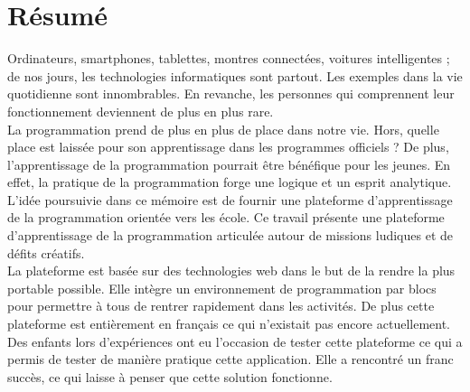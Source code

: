 \section*{Résumé}
Ordinateurs, smartphones, tablettes, montres connectées, voitures intelligentes ; de nos jours, les technologies informatiques sont partout. Les exemples dans la vie quotidienne sont innombrables. En revanche, les personnes qui comprennent leur fonctionnement deviennent de plus en plus rare.\\

La programmation prend de plus en plus de place dans notre vie. Hors, quelle place est laissée pour son apprentissage dans les programmes officiels ? De plus, l'apprentissage de la programmation pourrait être bénéfique pour les jeunes. En effet, la pratique de la programmation forge une logique et un esprit analytique.\\

L'idée poursuivie dans ce mémoire est de fournir une plateforme d'apprentissage de la programmation orientée vers les école. Ce travail présente une plateforme d'apprentissage de la programmation articulée autour de missions ludiques et de défits créatifs.\\

La plateforme est basée sur des technologies web dans le but de la rendre la plus portable possible. Elle intègre un environnement de programmation par blocs pour permettre à tous de rentrer rapidement dans les activités. De plus cette plateforme est entièrement en français ce qui n'existait pas encore actuellement.\\

Des enfants lors d'expériences ont eu l'occasion de tester cette plateforme ce qui a permis de tester de manière pratique cette application. Elle a rencontré un franc succès, ce qui laisse à penser que cette solution fonctionne.


